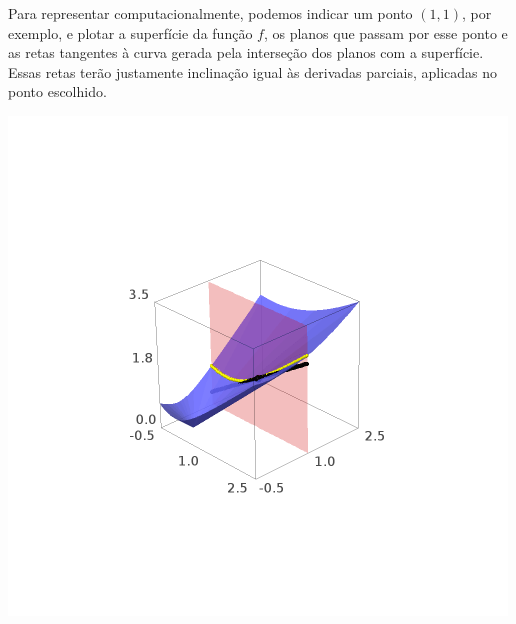 \documentclass[../main.tex]{subfiles}
\begin{document}
\begin{solucao}
\begin{enumerate}[label=\arabic*.]
				Para representar computacionalmente, podemos indicar um ponto $(1,1)$, por exemplo, e plotar a superfície da função $f$, os planos que passam por esse ponto e as retas tangentes à curva gerada pela interseção dos planos com a superfície. Essas retas terão justamente inclinação igual às derivadas parciais, aplicadas no ponto escolhido.
				\begin{center}
					\begin{minipage}{0.45\textwidth}
						\centering
						\includegraphics[width=\textwidth]{imagens/lista04/picture_lista04.02_q01_item05.01.png}
					\end{minipage}
					\hfill
					\begin{minipage}{0.45\textwidth}
						\centering

\end{minipage}
\end{center}
\end{enumerate}
\end{solucao}
\end{document}
